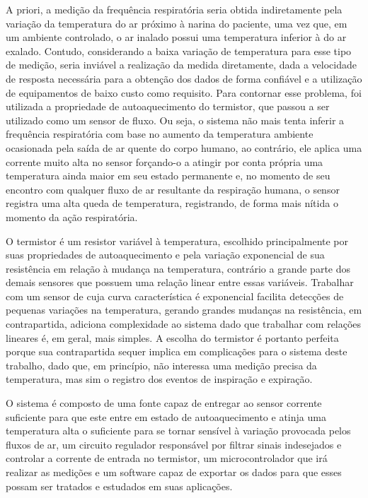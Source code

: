 	A priori, a medição da frequência respiratória seria obtida indiretamente pela variação da temperatura do ar próximo à narina do paciente, uma vez que, em um ambiente controlado, o ar inalado possui uma temperatura inferior à do ar exalado. Contudo, considerando a baixa variação de temperatura para esse tipo de medição, seria inviável a realização da medida diretamente, dada a velocidade de resposta necessária para a obtenção dos dados de forma confiável e a utilização de equipamentos de baixo custo como requisito. Para contornar esse problema, foi utilizada a propriedade de autoaquecimento do termistor, que passou a ser utilizado como um sensor de fluxo. Ou seja, o sistema não mais tenta inferir a frequência respiratória com base no aumento da temperatura ambiente ocasionada pela saída de ar quente do corpo humano, ao contrário, ele aplica uma corrente muito alta no sensor forçando-o a atingir por conta própria uma temperatura ainda maior em seu estado permanente e, no momento de seu encontro com qualquer fluxo de ar resultante da respiração humana, o sensor registra uma alta queda de temperatura, registrando, de forma mais nítida o momento da ação respiratória.

	O termistor é um resistor variável à temperatura, escolhido principalmente por suas propriedades de autoaquecimento e pela variação exponencial de sua resistência em relação à mudança na temperatura, contrário a grande parte dos demais sensores que possuem uma relação linear entre essas variáveis. Trabalhar com um sensor de cuja curva característica é exponencial facilita detecções de pequenas variações na temperatura, gerando grandes mudanças na resistência, em contrapartida, adiciona complexidade ao sistema dado que trabalhar com relações lineares é, em geral, mais simples. A escolha do termistor é portanto perfeita porque sua contrapartida sequer implica em complicações para o sistema deste trabalho, dado que, em princípio, não interessa uma medição precisa da temperatura, mas sim o registro dos eventos de inspiração e expiração.
	
	O sistema é composto de uma fonte capaz de entregar ao sensor corrente suficiente para que este entre em estado de autoaquecimento e atinja uma temperatura alta o suficiente para se tornar sensível à variação provocada pelos fluxos de ar, um circuito regulador responsável por filtrar sinais indesejados e controlar a corrente de entrada no termistor, um microcontrolador que irá realizar as medições e um software capaz de exportar os dados para que esses possam ser tratados e estudados em suas aplicações.  

